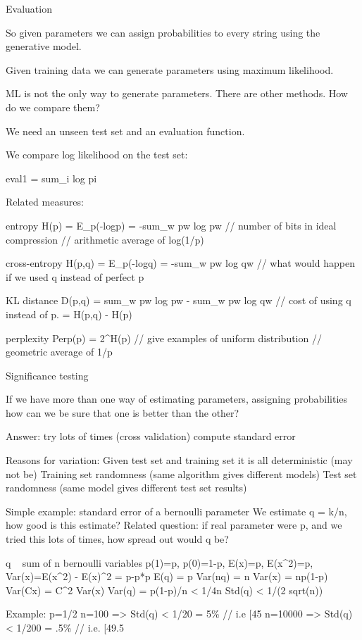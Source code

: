 Evaluation

So given parameters we can assign probabilities to every string using
the generative model.

Given training data we can generate parameters using maximum
likelihood.

ML is not the only way to generate parameters.  There are other
methods.  How do we compare them?  

We need an unseen test set and an evaluation function.

We compare log likelihood on the test set:

eval1 = sum_i log pi

Related measures:

entropy H(p) = E_p(-logp) = -sum_w pw log pw 
// number of bits in ideal compression
// arithmetic average of log(1/p)

cross-entropy H(p,q) = E_p(-logq) = -sum_w pw log qw  
// what would happen if we used q instead of perfect p

KL distance D(p,q) = sum_w pw log pw - sum_w pw log qw  
// cost of using q instead of p. = H(p,q) - H(p)

perplexity Perp(p) = 2^H(p)
// give examples of uniform distribution
// geometric average of 1/p



Significance testing

If we have more than one way of estimating parameters, assigning
probabilities how can we be sure that one is better than the other?

Answer: try lots of times (cross validation)
compute standard error

Reasons for variation: 
Given test set and training set it is all deterministic (may not be)
Training set randomness (same algorithm gives different models)
Test set randomness (same model gives different test set results)

Simple example: standard error of a bernoulli parameter
We estimate q = k/n, how good is this estimate?
Related question: if real parameter were p, and we tried this lots of
times, how spread out would q be?

q ~ sum of n bernoulli variables
p(1)=p, p(0)=1-p, E(x)=p, E(x^2)=p, Var(x)=E(x^2) - E(x)^2 = p-p*p 
E(q) = p
Var(nq) = n Var(x) = np(1-p)
Var(Cx) = C^2 Var(x)
Var(q) = p(1-p)/n < 1/4n
Std(q) < 1/(2 sqrt(n))

Example: p=1/2
n=100 => Std(q) < 1/20 = 5\%  // i.e [45%
n=10000 => Std(q) < 1/200 = .5\% // i.e. [49.5%

